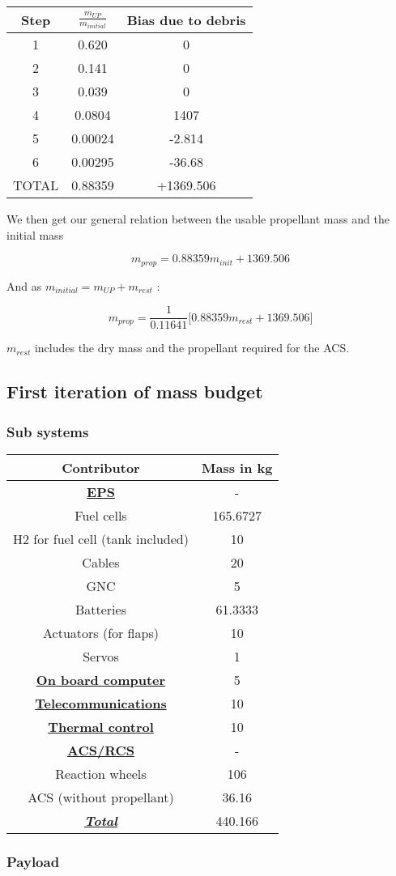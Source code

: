 \begin{longtable}[]{@{}ccc@{}}
\toprule
Step & \(\frac{m_{UP}}{m_{initial}}\) & Bias due to
debris\tabularnewline
\midrule
\endhead
1 & 0.620 & 0\tabularnewline
2 & 0.141 & 0\tabularnewline
3 & 0.039 & 0\tabularnewline
4 & 0.0804 & 1407\tabularnewline
5 & 0.00024 & -2.814\tabularnewline
6 & 0.00295 & -36.68\tabularnewline
TOTAL & 0.88359 & +1369.506\tabularnewline
\bottomrule
\end{longtable}

We then get our general relation between the usable propellant mass and
the initial mass

\[m_{prop} = 0.88359 m_{init} + 1369.506\]

And as \(m_{initial} = m_{UP} + m_{rest}\) :

\[m_{prop} = \frac 1{0.11641}\bigg[0.88359 m_{rest} + 1369.506\bigg]\]

\(m_{rest}\) includes the dry mass and the propellant required for the
ACS.

\subsection{First iteration of mass budget}


\subsubsection{Sub systems}

\begin{longtable}[]{@{}cc@{}}
\toprule
Contributor & Mass in kg\tabularnewline
\midrule
\endhead
\underline{\textbf{EPS}} & -\tabularnewline
Fuel cells & 165.6727\tabularnewline
H2 for fuel cell (tank included) & 10\tabularnewline
Cables & 20\tabularnewline
GNC & 5\tabularnewline
Batteries & 61.3333\tabularnewline
Actuators (for flaps) & 10\tabularnewline
Servos & 1\tabularnewline
\underline{\textbf{On board computer}} & 5\tabularnewline
\underline{\textbf{Telecommunications}} & 10\tabularnewline
\underline{\textbf{Thermal control}} & 10\tabularnewline
\underline{\textbf{ACS/RCS}} & -\tabularnewline
Reaction wheels & 106\tabularnewline
ACS (without propellant) & 36.16\tabularnewline
\underline{\textbf{\emph{Total}}} & 440.166\tabularnewline
\bottomrule
\end{longtable}


\subsubsection{Payload}

